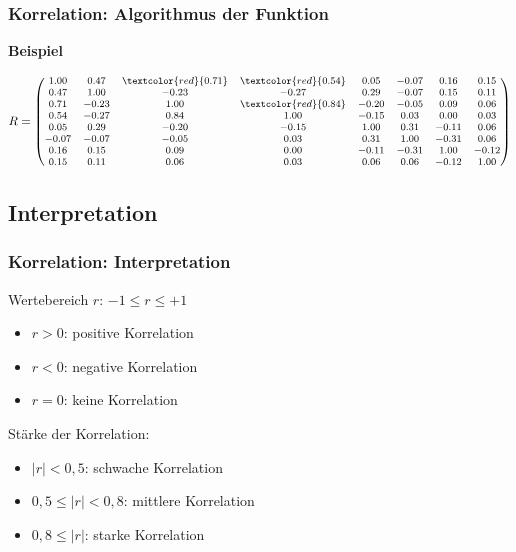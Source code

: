 \documentclass{beamer}
\begin{document}
\begin{frame}
	\frametitle{Korrelation: Algorithmus der Funktion}
	
	\par \textbf{Beispiel}

	\begin{equation*}
		R =
		\begin{footnotesize}
			\begin{pmatrix}
				1.00 & 0.47 & \textcolor{red}{0.71} & \textcolor{red}{0.54} & 0.05 & -0.07 & 0.16 & 0.15\\
   			0.47 & 1.00 & -0.23 & -0.27 & 0.29 & -0.07 & 0.15 & 0.11\\
  	 		0.71 & -0.23 & 1.00 & \textcolor{red}{0.84} & -0.20 & -0.05 & 0.09 & 0.06\\
	   		0.54 & -0.27 & 0.84 & 1.00 & -0.15 & 0.03 & 0.00 & 0.03\\
  	 		0.05 &  0.29 & -0.20 & -0.15 & 1.00 & 0.31 & -0.11 & 0.06\\
  			-0.07 & -0.07 & -0.05 & 0.03 & 0.31 & 1.00 & -0.31 & 0.06\\
				0.16 &  0.15 & 0.09 & 0.00 & -0.11 & -0.31 & 1.00 & -0.12\\
  			0.15 &  0.11 & 0.06 & 0.03 & 0.06 & 0.06 & -0.12 & 1.00\\
			\end{pmatrix}
		\end{footnotesize}
	\end{equation*}
\end{frame}

\subsection{Interpretation}

\begin{frame}
	\frametitle{Korrelation: Interpretation}

	Wertebereich $r$: $-1 \leq r \leq +1$
	\begin{itemize}
    \item $r>0$: positive Korrelation
    \item $r<0$: negative Korrelation
    \item $r=0$: keine Korrelation
	\end{itemize}
	Stärke der Korrelation:
	\begin{itemize}
    \item $|r|<0,5$: schwache Korrelation
    \item $0,5 \leq |r| < 0,8$: mittlere Korrelation
    \item $0,8 \leq |r|$: starke Korrelation
	\end{itemize}
\end{frame}
\end{document}
